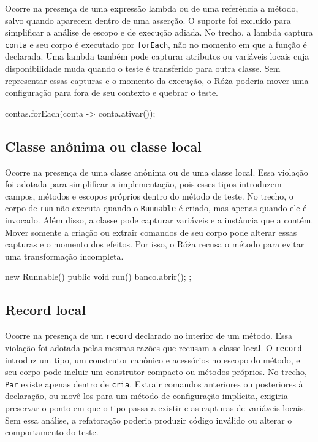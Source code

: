 Ocorre na presença de uma expressão lambda ou de uma referência a método, salvo quando aparecem dentro de uma asserção. O suporte foi excluído para simplificar a análise de escopo e de execução adiada. No trecho, a lambda captura \texttt{conta} e seu corpo é executado por \texttt{forEach}, não no momento em que a função é declarada. Uma lambda também pode capturar atributos ou variáveis locais cuja disponibilidade muda quando o teste é transferido para outra classe. Sem representar essas capturas e o momento da execução, o Róża poderia mover uma configuração para fora de seu contexto e quebrar o teste.

\begin{violationexample}
contas.forEach(conta -> conta.ativar());
\end{violationexample}

\subsection{Classe anônima ou classe local}

Ocorre na presença de uma classe anônima ou de uma classe local. Essa violação foi adotada para simplificar a implementação, pois esses tipos introduzem campos, métodos e escopos próprios dentro do método de teste. No trecho, o corpo de \texttt{run} não executa quando o \texttt{Runnable} é criado, mas apenas quando ele é invocado. Além disso, a classe pode capturar variáveis e a instância que a contém. Mover somente a criação ou extrair comandos de seu corpo pode alterar essas capturas e o momento dos efeitos. Por isso, o Róża recusa o método para evitar uma transformação incompleta.

\begin{violationexample}
new Runnable() {
    public void run() { banco.abrir(); }
};
\end{violationexample}

\subsection{Record local}

Ocorre na presença de um \texttt{record} declarado no interior de um método. Essa violação foi adotada pelas mesmas razões que recusam a classe local. O \texttt{record} introduz um tipo, um construtor canônico e acessórios no escopo do método, e seu corpo pode incluir um construtor compacto ou métodos próprios. No trecho, \texttt{Par} existe apenas dentro de \texttt{cria}. Extrair comandos anteriores ou posteriores à declaração, ou movê-los para um método de configuração implícita, exigiria preservar o ponto em que o tipo passa a existir e as capturas de variáveis locais. Sem essa análise, a refatoração poderia produzir código inválido ou alterar o comportamento do teste.

